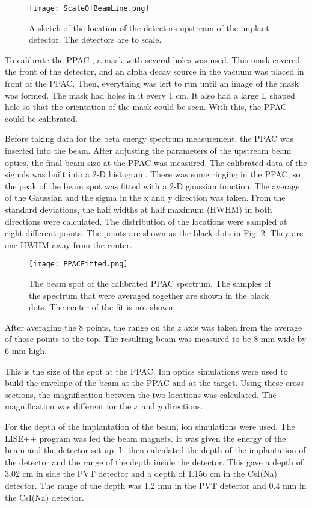 \documentclass[../MaxHughesThesis.tex]{subfiles}
\begin{document}
\begin{figure}
	\centerline{\texttt{[image: ScaleOfBeamLine.png]}}
	\caption{A sketch of the location of the detectors upstream of the implant detector.
		    The detectors are to scale.
			}
	\label{fig:BeamSetUp}
\end{figure}  

To calibrate the PPAC , a mask with several holes was used. 
This mask covered the front of the detector, and an alpha decay source in the vacuum was placed in front of the PPAC.
Then, everything was left to run until an image of the mask was formed.
The mask had holes in it every 1 cm. 
It also had a large L shaped hole so that the orientation of the mask could be seen. 
With this, the PPAC could be calibrated.

Before taking data for the beta energy spectrum measurement, the PPAC was inserted into the beam.
After adjusting the parameters of the upstream beam optics, the final beam size at the PPAC was measured.
The calibrated data of the signals was built into a 2-D histogram.
There was some ringing in the PPAC, so the peak of the beam spot was fitted with a 2-D gaussian function.
The average of the Gaussian and the sigma in the x and y direction was taken. 
From the standard deviations, the half widths at half maximum (HWHM) in both directions were calculated. 
The distribution of the locations were sampled at eight different points. 
The points are shown as the black dots in Fig: \ref{fig:PPACSpotch}.
They are one HWHM away from the center. 

\begin{figure}
	\centerline{\texttt{[image: PPACFitted.png]}}
	\caption{The beam spot of the calibrated PPAC spectrum. 
		 The samples of the spectrum that were averaged together are shown in the black dots.
		 The center of the fit is not shown.}
	\label{fig:PPACSpotch}
\end{figure}  

After averaging the 8 points, the range on the $z$ axis was taken from the average of those points to the top.
The resulting beam was measured to be 8 mm wide by 6 mm high.

This is the size of the spot at the PPAC. 
Ion optics simulations were used to build the envelope of the beam at the PPAC and at the target.
Using these cross sections, the magnification between the two locations was calculated.
The magnification was different for the $x$ and $y$ directions.

For the depth of the implantation of the beam, ion simulations were used. 
The LISE++ program was fed the beam magnets. It was given the energy of the beam and the detector set up. 
It then calculated the depth of the implantation of the detector and the range of the depth inside the detector. 
This gave a depth of 3.02 cm in side the PVT detector and a depth of 1.156 cm in the CsI(Na) detector. 
The range of the depth was 1.2 mm in the PVT detector and 0.4 mm in the CsI(Na) detector.
\end{document}
